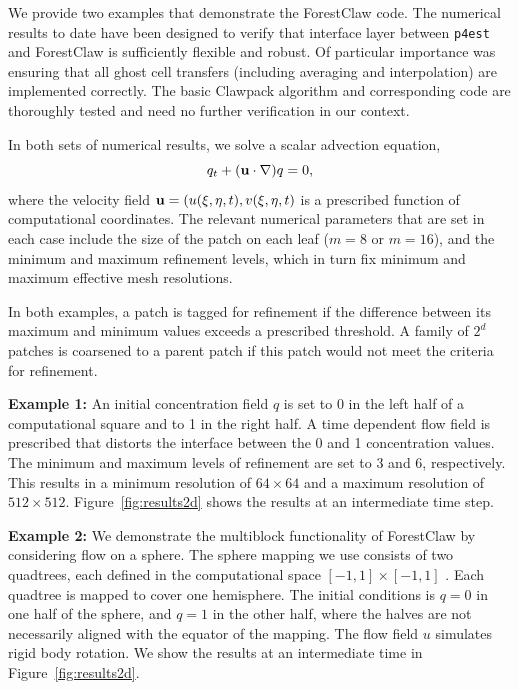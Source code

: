 \documentclass{IOS-Book-Article}     %
\newcommand{\clawpack}{{\sc Clawpack}\xspace}
\newcommand{\forestclaw}{ForestClaw\xspace}
\newcommand{\pforest}{\texttt{p4est}\xspace}
\newcommand{\plotbox}[1]{#1}
\newcommand{\Fig}[1]{Figure~\ref{fig:#1}}
\begin{document}
We provide two examples that demonstrate the \forestclaw code.
The numerical results to date have been designed to verify that
interface layer between \pforest and \forestclaw is sufficiently
flexible and robust.  Of particular importance was ensuring that all
ghost cell transfers (including averaging and
interpolation) are implemented correctly.
The basic \clawpack algorithm and corresponding code are
thoroughly tested and need no further verification in our context.

In both sets of numerical results, we solve a scalar advection
equation,
\begin{equation}
q_t + ({\bf u}\cdot \nabla) q = 0 ,
\end{equation}
where the velocity field ${\bf u} = (u(\xi,\eta,t), v(\xi,\eta,t)$ is
a prescribed function of computational coordinates.  The relevant
numerical parameters that are set in each case include the size of the
patch on each leaf ($m=8$ or $m=16$), and the minimum and maximum
refinement levels, which in turn fix minimum and maximum effective mesh
resolutions.

In both examples, a patch is tagged for refinement if the
difference between its maximum and minimum values exceeds a prescribed
threshold.  A family of $2^d$ patches is coarsened to a parent patch
if this patch would not meet the criteria for refinement.

\begin{description}
\item{\bf Example 1:} An initial concentration field $q$
is set to 0 in the left half of a computational square and to 1 in the
right half.  A time dependent flow field is prescribed that distorts
the interface between the 0 and 1 concentration values.  The minimum
and maximum levels of refinement are set to 3 and 6, respectively.
This results in a minimum resolution of $64 \times 64$ and a maximum
resolution of $512 \times 512$.  \Fig{results2d} shows the results
at an intermediate time step.


\item{\bf Example 2:} We demonstrate the
multiblock functionality of \forestclaw by considering flow on a
sphere.  The sphere mapping we use consists of two quadtrees, each
defined in the computational space $[-1,1] \times [-1,1]$
\cite{ca-he-le:2008, be-ca-he-le:2009}.  Each quadtree is mapped to cover one
hemisphere.  The initial conditions is $q = 0$ in one half of
the sphere, and $q = 1$ in the other half, where the halves are not
necessarily aligned with the equator of the mapping.  The flow field
${u}$ simulates rigid body rotation.  We show the results at an intermediate
time in \Fig{results2d}.
\end{description}
\end{document}
